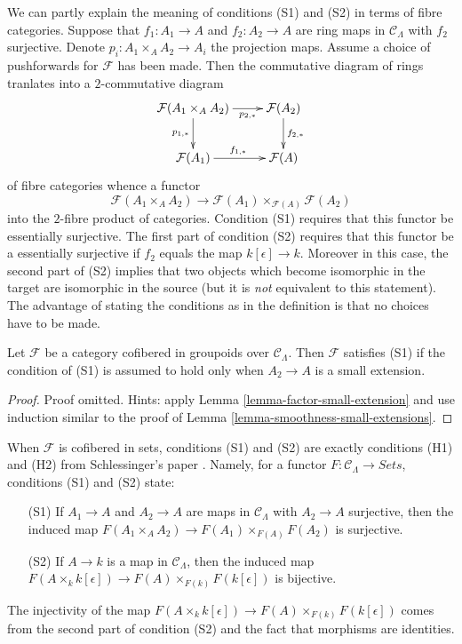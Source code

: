\noindent
We can partly explain the meaning of conditions (S1) and (S2) in terms of
fibre categories. Suppose that $f_1 : A_1 \to A$ and $f_2 : A_2 \to A$ are
ring maps in $\mathcal{C}_\Lambda$ with $f_2$ surjective.
Denote $p_i : A_1 \times_A A_2 \to A_i$ the projection maps.
Assume a choice of pushforwards for $\mathcal{F}$ has been made.
Then the commutative diagram of rings tranlates into a $2$-commutative diagram
$$
\xymatrix{
\mathcal{F}(A_1 \times_A A_2) \ar[r]_-{p_{2, *}} \ar[d]_{p_{1, *}} &
\mathcal{F}(A_2) \ar[d]^{f_{2, *}} \\
\mathcal{F}(A_1) \ar[r]^{f_{1, *}} & \mathcal{F}(A)
}
$$
of fibre categories whence a functor
\begin{equation}
\label{equation-compare}
\mathcal{F}(A_1 \times_A A_2) \to
\mathcal{F}(A_1) \times_{\mathcal{F}(A)} \mathcal{F}(A_2)
\end{equation}
into the $2$-fibre product of categories.
Condition (S1) requires that this functor be essentially surjective.
The first part of condition (S2) requires that this functor be a
essentially surjective if $f_2$ equals the map $k[\epsilon] \to k$.
Moreover in this case, the second part of (S2) implies that two objects
which become isomorphic in the target are isomorphic in the source
(but it is {\it not} equivalent to this statement).
The advantage of stating the conditions as in the definition
is that no choices have to be made.

\begin{lemma}
\label{lemma-S1-small-extensions}
Let $\mathcal{F}$ be a category cofibered in groupoids over $\mathcal
C_\Lambda$. Then $\mathcal{F}$ satisfies (S1) if the condition of (S1)
is assumed to hold only when $A_2 \to A$ is a small extension.
\end{lemma}

\begin{proof}
Proof omitted. Hints: apply Lemma \ref{lemma-factor-small-extension}
and use induction similar to the proof of
Lemma \ref{lemma-smoothness-small-extensions}.
\end{proof}

\begin{remark}
\label{remark-compare-S1-S2-schlessinger}
When $\mathcal{F}$ is cofibered in sets, conditions (S1) and (S2) are exactly
conditions (H1) and (H2) from Schlessinger's paper \cite{Sch}.
Namely, for a functor $F: \mathcal{C}_\Lambda \to
\textit{Sets}$, conditions (S1) and (S2) state:
\begin{enumerate}
\item [(S1)] If $A_1 \to A$ and $A_2 \to A$ are maps in
$\mathcal{C}_\Lambda$ with $A_2 \to A$ surjective, then the induced
map $F(A_1 \times_A A_2) \to F(A_1) \times_{F(A)} F(A_2)$ is
surjective.
\item [(S2)]  If $A \to k$ is a map in $\mathcal{C}_\Lambda$, then the
induced map
$F(A \times_k k[\epsilon]) \to F(A) \times_{F(k)} F(k[\epsilon])$
is bijective.
\end{enumerate}
The injectivity of the map
$F(A \times_k k[\epsilon]) \to F(A) \times_{F(k)} F(k[\epsilon])$
comes from the second part of condition (S2) and the fact that morphisms
are identities.
\end{remark}

